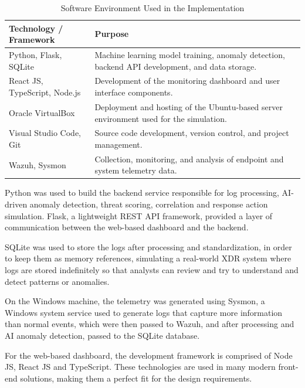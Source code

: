 \documentclass[12pt,a4paper]{report}
\begin{document}
\begin{table}[H]
\centering
\caption{Software Environment Used in the Implementation}
\label{tab:software_env}

\renewcommand{\arraystretch}{1.3}

\begin{tabular}{p{5cm} p{9cm}}
\toprule
\textbf{Technology / Framework} & \textbf{Purpose} \\
\midrule

Python, Flask, SQLite &
Machine learning model training, anomaly detection, backend API development, and data storage. \\

React JS, TypeScript, Node.js &
Development of the monitoring dashboard and user interface components. \\

Oracle VirtualBox &
Deployment and hosting of the Ubuntu-based server environment used for the simulation. \\

Visual Studio Code, Git &
Source code development, version control, and project management. \\

Wazuh, Sysmon &
Collection, monitoring, and analysis of endpoint and system telemetry data. \\

\bottomrule
\end{tabular}
\end{table}

Python was used to build the backend service responsible for log processing, AI-driven anomaly
detection, threat scoring, correlation and response action simulation. Flask, a lightweight REST
API framework, provided a layer of communication between the web-based dashboard and the backend.

SQLite was used to store the logs after processing and standardization, in order to keep them as
memory references, simulating a real-world XDR system where logs are stored indefinitely so that
analysts can review and try to understand and detect patterns or anomalies.

On the Windows machine, the telemetry was generated using Sysmon, a Windows system service used
to generate logs that capture more information than normal events, which were then passed to
Wazuh, and after processing and AI anomaly detection, passed to the SQLite database.

For the web-based dashboard, the development framework is comprised of Node JS, React JS and
TypeScript. These technologies are used in many modern front-end solutions, making them a perfect
fit for the design requirements.
\end{document}

